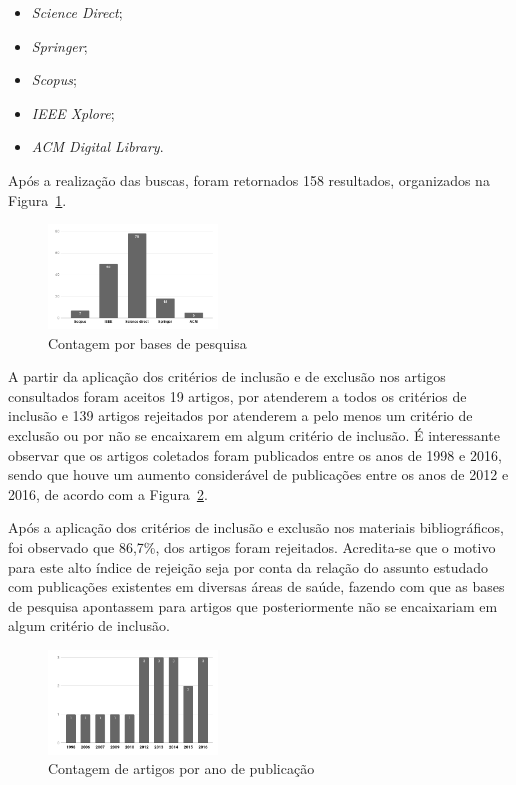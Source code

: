 \begin{itemize}
\item \textit{Science Direct};
\item \textit{Springer};
\item \textit{Scopus};
\item \textit{IEEE Xplore};
\item \textit{ACM Digital Library}.
\end{itemize}

Após a realização das buscas, foram retornados 158 resultados, organizados na Figura~\ref{bases}. 

\begin{figure}[ht]
\begin{center}
\includegraphics[width=0.4\textwidth]{base_de_dados_de_origem.png}
\caption{Contagem por bases de pesquisa \label{bases}}
\end{center}
\end{figure}


A partir da aplicação dos critérios de inclusão e de exclusão nos artigos consultados foram aceitos 19 artigos, por atenderem a todos os critérios de inclusão e 139 artigos rejeitados por atenderem a pelo menos um critério de exclusão ou por não se encaixarem em algum critério de inclusão. É interessante observar que os artigos coletados foram publicados entre os anos de 1998 e 2016, sendo que houve um aumento considerável de publicações entre os anos de 2012 e 2016, de acordo com a Figura~\ref{ano}.
 
Após a aplicação dos critérios de inclusão e exclusão nos materiais bibliográficos, foi observado que 86,7\%,  dos artigos foram rejeitados. Acredita-se que o motivo para este alto índice de rejeição seja por conta da relação do assunto estudado com publicações existentes em diversas áreas de saúde, fazendo com que as bases de pesquisa apontassem para artigos que posteriormente não se encaixariam em algum critério de inclusão. 

\begin{figure}[ht]
\begin{center}
\includegraphics[width=0.4\textwidth]{contagem_por_ano.png}
\caption{Contagem de artigos por ano de publicação \label{ano}}
\end{center}
\end{figure}

